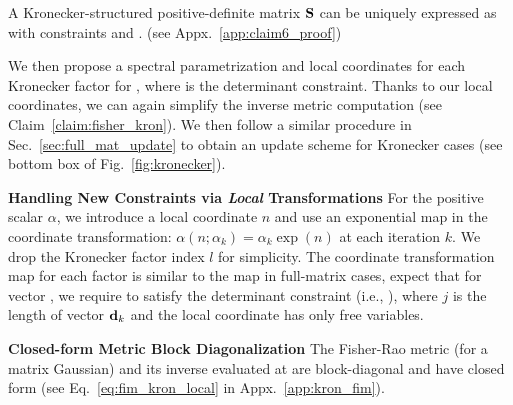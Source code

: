 \vspace{0.05cm}
\begin{claim}
\label{claim:kron_unique}
    A Kronecker-structured positive-definite matrix $\mbox{$\mbox{$\mathbf{S}$}$}$ can be uniquely expressed as  
    \scalebox{0.8}{ $\vS=\alpha [\vS^{(C)} \otimes \vS^{(K)}]$ } with constraints   and \scalebox{0.8}{$\alpha>0$}. 
    (see Appx.~\ref{app:claim6_proof})
\end{claim}

%
%

\vspace{-0.2cm}
We then propose a spectral parametrization and local coordinates for each Kronecker factor 
for  , where 
  is  the  determinant constraint.
Thanks to our local coordinates, we can again  simplify the inverse metric computation (see  Claim~\ref{claim:fisher_kron}).
%
%
We then follow a similar procedure in Sec.~\ref{sec:full_mat_update} to obtain an update scheme for Kronecker cases (see bottom box of Fig.~\ref{fig:kronecker}).

\vspace{-0.05cm}
{\bf Handling New Constraints via \emph{Local} Transformations}
For the positive scalar $\alpha$, we introduce a local coordinate $n$ and use an exponential map in the coordinate transformation: $\alpha(n; \alpha_k) = \alpha_k \exp(n)$ at each iteration $k$.
 We drop the Kronecker factor index $l$ for simplicity. The coordinate transformation map for each factor is similar to the map in full-matrix cases, expect that for vector 
, 
we require   to satisfy the determinant constraint (i.e.,
), where $j$ is the length of vector $\mbox{$\mbox{$\mathbf{d}$}$}_k$ and the local coordinate 
 has only \scalebox{0.8}{$(j-1)$} free variables.


\begin{claim}
\label{claim:fisher_kron}
{\bf{Closed-form Metric Block Diagonalization}}
    The Fisher-Rao metric  (for a  matrix Gaussian) 
 and its inverse evaluated at  are block-diagonal and have closed form (see Eq.~\eqref{eq:fim_kron_local} in Appx.~\ref{app:kron_fim}).
\end{claim}

